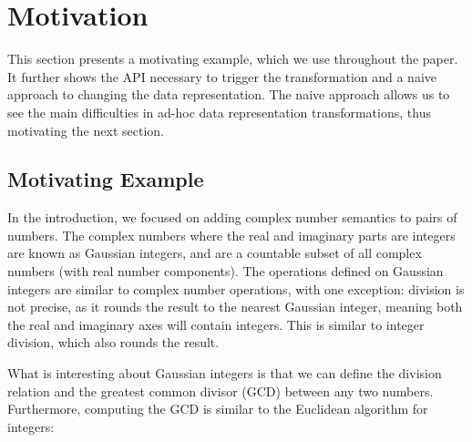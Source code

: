 \section{Motivation}
\label{sec:problem}

This section presents a motivating example, which we use throughout the paper. It further shows the API necessary to trigger the transformation and a naive approach to changing the data representation. The naive approach allows us to see the main difficulties in ad-hoc data representation transformations, thus motivating the next section.

\subsection{Motivating Example}

In the introduction, we focused on adding complex number semantics to pairs of numbers. The complex numbers where the real and imaginary parts are integers are known as Gaussian integers, and are a countable subset of all complex numbers (with real number components). The operations defined on Gaussian integers are similar to complex number operations, with one exception: division is not precise, as it rounds the result to the nearest Gaussian integer, meaning both the real and imaginary axes will contain integers. This is similar to integer division, which also rounds the result.


What is interesting about Gaussian integers is that we can define the division relation and the greatest common divisor (GCD) between any two numbers. Furthermore, computing the GCD is similar to the Euclidean algorithm for integers:


